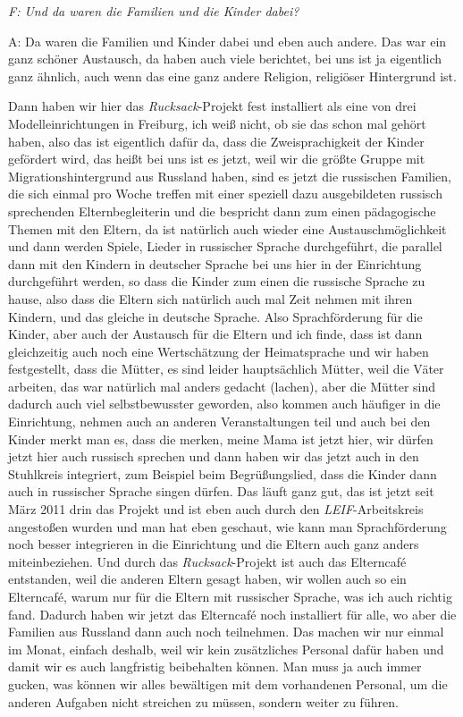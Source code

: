 \begin{linenumbers*}
\emph{F: Und da waren die Familien und die Kinder dabei?}

A: Da waren die Familien und Kinder dabei und eben auch andere. Das war ein ganz schöner Austausch, da haben auch viele berichtet, bei uns ist ja eigentlich ganz ähnlich, auch wenn das eine ganz andere Religion, religiöser Hintergrund ist. 

Dann haben wir hier das \emph{Rucksack}-Projekt fest installiert als eine von drei Modelleinrichtungen in Freiburg, ich weiß nicht, ob sie das schon mal gehört haben, also das ist eigentlich dafür da, dass die Zweisprachigkeit der Kinder gefördert wird, das heißt bei uns ist es jetzt, weil wir die größte Gruppe mit Migrationshintergrund aus Russland haben, sind es jetzt die russischen Familien, die sich einmal pro Woche treffen mit einer speziell dazu ausgebildeten russisch sprechenden Elternbegleiterin und die bespricht dann zum einen pädagogische Themen mit den Eltern, da ist natürlich auch wieder eine Austauschmöglichkeit und dann werden Spiele, Lieder in russischer Sprache durchgeführt, die parallel dann mit den Kindern in deutscher Sprache bei uns hier in der Einrichtung durchgeführt werden, so dass die Kinder zum einen die russische Sprache zu hause, also dass die Eltern sich natürlich auch mal Zeit nehmen mit ihren Kindern, und das gleiche in deutsche Sprache. Also Sprachförderung für die Kinder, aber auch der Austausch für die Eltern und ich finde, dass ist dann gleichzeitig auch noch eine Wertschätzung der Heimatsprache und wir haben festgestellt, dass die Mütter, es sind leider hauptsächlich Mütter, weil die Väter arbeiten, das war natürlich mal anders gedacht (lachen), 
aber die Mütter sind dadurch auch viel selbstbewusster geworden, also kommen auch häufiger in die Einrichtung, nehmen auch an anderen Veranstaltungen teil und auch bei den Kinder merkt man es, dass die merken, meine Mama ist jetzt hier, wir dürfen jetzt hier auch russisch sprechen und dann haben wir das jetzt auch in den Stuhlkreis integriert, zum Beispiel beim Begrüßungslied, dass die Kinder dann auch in russischer Sprache singen dürfen. Das läuft ganz gut, das ist jetzt seit März 2011 drin das Projekt und ist eben auch durch den \emph{LEIF}-Arbeitskreis angestoßen wurden und man hat eben geschaut, wie kann man Sprachförderung noch besser integrieren in die Einrichtung und die Eltern auch ganz anders miteinbeziehen. Und durch das \emph{Rucksack}-Projekt ist auch das Elterncafé entstanden, weil die anderen Eltern gesagt haben, wir wollen auch so ein Elterncafé, warum nur für die Eltern mit russischer Sprache, was ich auch richtig fand. Dadurch haben wir jetzt das Elterncafé noch installiert für alle, wo aber die Familien aus Russland dann auch noch teilnehmen. Das machen wir nur einmal im Monat, einfach deshalb, weil wir kein zusätzliches Personal dafür haben und damit wir es auch langfristig beibehalten können. Man muss ja auch immer gucken, was können wir alles bewältigen mit dem vorhandenen Personal, um die anderen Aufgaben nicht streichen zu müssen, sondern weiter zu führen. 


\end{linenumbers*}
